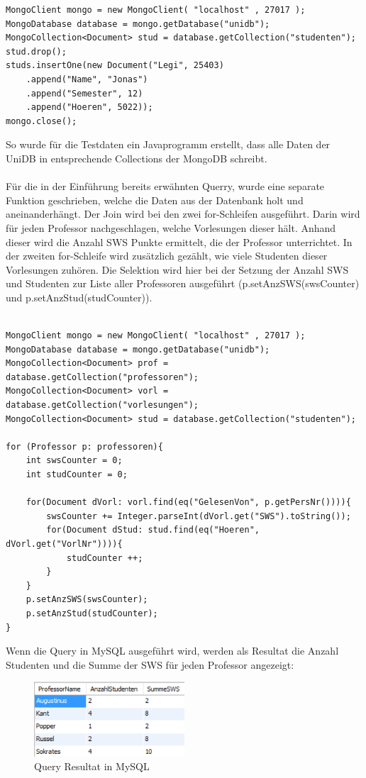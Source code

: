 \begin{lstlisting}[basicstyle=\scriptsize]
MongoClient mongo = new MongoClient( "localhost" , 27017 );
MongoDatabase database = mongo.getDatabase("unidb");
MongoCollection<Document> stud = database.getCollection("studenten");
stud.drop();
studs.insertOne(new Document("Legi", 25403)
	.append("Name", "Jonas")
	.append("Semester", 12)
	.append("Hoeren", 5022));
mongo.close();
\end{lstlisting}
\noindent
So wurde für die Testdaten ein Javaprogramm erstellt, dass alle Daten der UniDB in entsprechende Collections der MongoDB schreibt.
\\\\
Für die in der Einführung bereits erwähnten Querry, wurde eine separate Funktion geschrieben, welche die Daten aus der Datenbank holt und aneinanderhängt. Der Join wird bei den zwei for-Schleifen ausgeführt. Darin wird für jeden Professor nachgeschlagen, welche Vorlesungen dieser hält. Anhand dieser wird die Anzahl SWS Punkte ermittelt, die der Professor unterrichtet. In der zweiten for-Schleife wird zusätzlich gezählt, wie viele Studenten dieser Vorlesungen zuhören. Die Selektion wird hier bei der Setzung der Anzahl SWS und Studenten zur Liste aller Professoren ausgeführt (p.setAnzSWS(swsCounter) und p.setAnzStud(studCounter)). 
\\\\
\begin{lstlisting}[basicstyle=\scriptsize]
MongoClient mongo = new MongoClient( "localhost" , 27017 );
MongoDatabase database = mongo.getDatabase("unidb");
MongoCollection<Document> prof = database.getCollection("professoren");
MongoCollection<Document> vorl = database.getCollection("vorlesungen");
MongoCollection<Document> stud = database.getCollection("studenten");

for (Professor p: professoren){
	int swsCounter = 0;
	int studCounter = 0;
	
	for(Document dVorl: vorl.find(eq("GelesenVon", p.getPersNr()))){
		swsCounter += Integer.parseInt(dVorl.get("SWS").toString());
		for(Document dStud: stud.find(eq("Hoeren", dVorl.get("VorlNr")))){
			studCounter ++;
		}
	}
	p.setAnzSWS(swsCounter);
	p.setAnzStud(studCounter);
}
\end{lstlisting}
\noindent
Wenn die Query in MySQL ausgeführt wird, werden als Resultat die Anzahl Studenten und die Summe der SWS für jeden Professor angezeigt:

\begin{figure}[h] 
	\centering
	\includegraphics[width=0.5\textwidth]{./pictures/Query_MySQL_result.png}
	\caption{Query Resultat in MySQL}
	\label{fig:mysqlres}
\end{figure}

